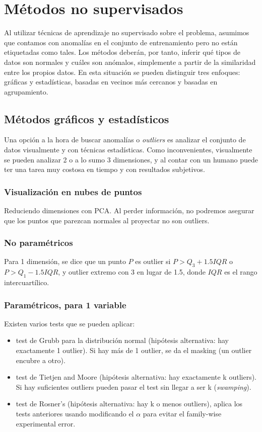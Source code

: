 \documentclass[a4paper,11pt,spanish]{report}
\let\stdsection\section
\let\stdsub\subsection
\let\stdsubsub\subsubsection
\renewcommand{\chapter}{\stdsection}
\renewcommand{\section}{\stdsub}
\renewcommand{\subsection}{\stdsubsub}
\begin{document}
\chapter{Métodos no supervisados}
\label{sec-2-4}

Al utilizar técnicas de aprendizaje no supervisado sobre el problema, asumimos que contamos con anomalías en el conjunto de entrenamiento pero no están etiquetadas como tales. Los métodos deberán, por tanto, inferir qué tipos de datos son normales y cuáles son anómalos, simplemente a partir de la similaridad entre los propios datos. En esta situación se pueden distinguir tres enfoques: gráficas y estadísticas, basadas en vecinos más cercanos y basadas en agrupamiento.

\section{Métodos gráficos y estadísticos}
\label{sec-2-4-1}

Una opción a la hora de buscar anomalías o \emph{outliers} es analizar el conjunto de datos visualmente y con técnicas estadísticas. Como inconvenientes, visualmente se pueden analizar 2 o a lo sumo 3 dimensiones, y al contar con un humano puede ter una tarea muy costosa en tiempo y con resultados subjetivos.

\subsection*{Visualización en nubes de puntos}
\label{sec-2-4-1-1}
Reduciendo dimensiones con PCA. Al perder información, no podremos asegurar que los puntos que parezcan normales al proyectar no son outliers.

\subsection*{No paramétricos}
\label{sec-2-4-1-2}
Para 1 dimensión, se dice que un punto $P$ es outlier si $P > Q_3 + 1.5 \mathit{IQR}$ o $P > Q_1 - 1.5 \mathit{IQR}$, y outlier extremo con 3 en lugar de 1.5, donde $\mathit{IQR}$ es el rango intercuartílico.

\subsection*{Paramétricos, para 1 variable}
\label{sec-2-4-1-3}

Existen varios tests que se pueden aplicar:
\begin{itemize}
\item test de Grubb para la distribución normal (hipótesis alternativa: hay exactamente 1 outlier). Si hay más de 1 outlier, se da el masking (un outlier encubre a otro).
\item test de Tietjen and Moore (hipótesis alternativa: hay exactamente k outliers). Si hay suficientes outliers pueden pasar el test sin llegar a ser k (\emph{swamping}).
\item test de Rosner's (hipótesis alternativa: hay k o menos outliers), aplica los tests anteriores usando modificando el $\alpha$ para evitar el family-wise experimental error.
\end{itemize}
\end{document}
